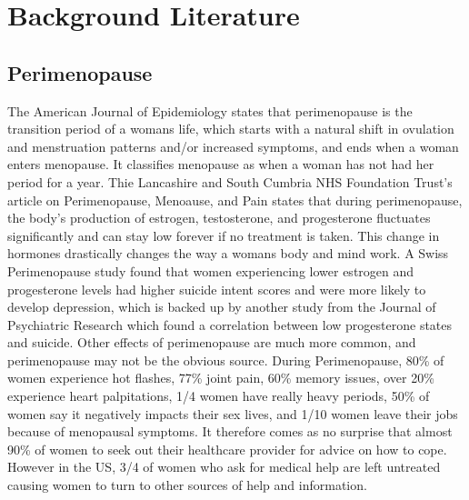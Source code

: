 \section{Background Literature}\label{backg}

\subsection{Perimenopause}
The American Journal of Epidemiology\cite{Brambilla1994} states that perimenopause is the transition period of a womans life, which starts with a natural shift in ovulation and menstruation patterns and/or increased symptoms, and ends when a woman enters menopause. It classifies menopause as when a woman has not had her period for a year. Thie Lancashire and South Cumbria NHS Foundation Trust's article on Perimenopause, Menoause, and Pain\cite{LSCFT2024} states that during perimenopause, the body's production of estrogen, testosterone, and progesterone fluctuates significantly and can stay low forever if no treatment is taken. This change in hormones drastically changes the way a womans body and mind work. A Swiss Perimenopause study\cite{Willi2021} found that women experiencing lower estrogen and progesterone levels had higher suicide intent scores and were more likely to develop depression, which is backed up by another study from the Journal of Psychiatric Research which found a correlation between low progesterone states and suicide\cite{BACAGARCIA2010209}. Other effects of perimenopause are much more common, and perimenopause may not be the obvious source. During Perimenopause, 80\% of women experience hot flashes\cite{Bansal2019}, 77\% joint pain\cite{ScienceDaily2013}, 60\% memory issues\cite{Gaytri2018}, over 20\% experience heart palpitations\cite{Sheng2021}, 1/4 women have really heavy periods\cite{Harlow2011}, 50\% of women say it negatively impacts their sex lives\cite{BMS2016}, and 1/10 women leave their jobs because of menopausal symptoms\cite{Brewis2017}. It therefore comes as no surprise that almost 90\% of women to seek out their healthcare provider for advice on how to cope\cite{Guthrie2003}. However in the US, 3/4 of women who ask for medical help are left untreated causing women to turn to other sources of help and information\cite{Wolff2018}. 

